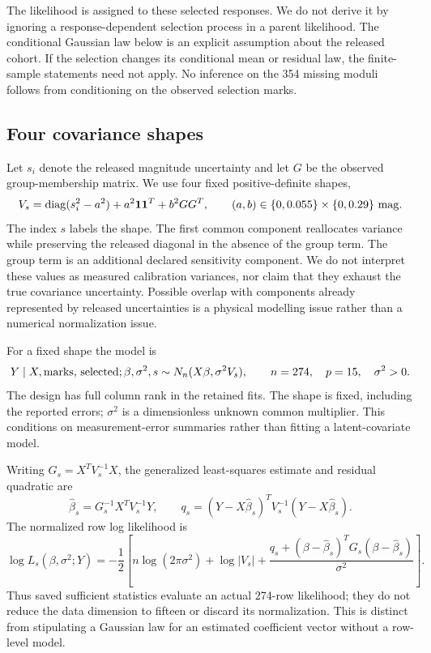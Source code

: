 The likelihood is assigned to these selected responses. We do not derive it by ignoring a response-dependent selection process in a parent likelihood. The conditional Gaussian law below is an explicit assumption about the released cohort. If the selection changes its conditional mean or residual law, the finite-sample statements need not apply. No inference on the 354 missing moduli follows from conditioning on the observed selection marks.

\subsection{Four covariance shapes}

Let $s_i$ denote the released magnitude uncertainty and let $G$ be the observed group-membership matrix. We use four fixed positive-definite shapes,
\begin{equation}
 V_s=\operatorname{diag}(s_i^2-a^2)+a^2\bm1\bm1^T+b^2GG^T,
 \qquad (a,b)\in\{0,0.055\}\times\{0,0.29\}\ \mathrm{mag}.
 \label{eq:covariance}
\end{equation}
The index $s$ labels the shape. The first common component reallocates variance while preserving the released diagonal in the absence of the group term. The group term is an additional declared sensitivity component. We do not interpret these values as measured calibration variances, nor claim that they exhaust the true covariance uncertainty. Possible overlap with components already represented by released uncertainties is a physical modelling issue rather than a numerical normalization issue.

For a fixed shape the model is
\begin{equation}
 Y\mid X,\hbox{marks, selected};\beta,\sigma^2,s
       \sim N_n(X\beta,\sigma^2V_s),
 \qquad n=274,\quad p=15,\quad \sigma^2>0.
 \label{eq:law}
\end{equation}
The design has full column rank in the retained fits. The shape is fixed, including the reported errors; $\sigma^2$ is a dimensionless unknown common multiplier. This conditions on measurement-error summaries rather than fitting a latent-covariate model.

Writing $G_s=X^TV_s^{-1}X$, the generalized least-squares estimate and residual quadratic are
\begin{equation}
 \widehat\beta_s=G_s^{-1}X^TV_s^{-1}Y,\qquad
 q_s=(Y-X\widehat\beta_s)^TV_s^{-1}(Y-X\widehat\beta_s).
 \label{eq:gls}
\end{equation}
The normalized row log likelihood is
\begin{equation}
 \log L_s(\beta,\sigma^2;Y)
 =-\frac12\left[n\log(2\pi\sigma^2)+\log|V_s|
       +\frac{q_s+(\beta-\widehat\beta_s)^TG_s(\beta-\widehat\beta_s)}{\sigma^2}\right].
 \label{eq:loglike}
\end{equation}
Thus saved sufficient statistics evaluate an actual 274-row likelihood; they do not reduce the data dimension to fifteen or discard its normalization. This is distinct from stipulating a Gaussian law for an estimated coefficient vector without a row-level model.

